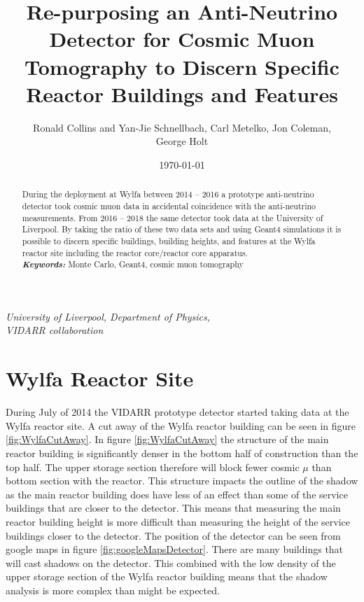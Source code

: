 \documentclass[12pt,a4paper]{article}
\title{Re-purposing an Anti-Neutrino Detector for Cosmic Muon Tomography to Discern Specific Reactor Buildings and Features}
\date{\today}
\author{Ronald Collins and Yan-Jie Schnellbach, Carl Metelko, Jon Coleman, \\George Holt}
\begin{document}
\maketitle


\begin{center}
\textit{University of Liverpool, Department of Physics,\\}
\textit{VIDARR collaboration\\}
\end{center}
 

\begin{abstract}
\normalsize During the deployment at Wylfa between 2014 -- 2016 a prototype anti-neutrino detector took cosmic muon data in accidental coincidence with the anti-neutrino measurements. From 2016 -- 2018 the same detector took data at the University of Liverpool. By taking the ratio of these two data sets and using Geant4 simulations it is possible to discern specific buildings, building heights, and features at the Wylfa reactor site including the reactor core/reactor core apparatus.\\

\providecommand{\keywords}[1]{\textbf{\textit{Keywords:}} #1} %
\keywords{Monte Carlo, Geant4, cosmic muon tomography}
\end{abstract}
\vspace{5mm} %



\section{Wylfa Reactor Site} \label{sec:wylfaReactorSite}
During July of 2014 the VIDARR prototype detector started taking data at the Wylfa reactor site. A cut away of the Wylfa reactor building can be seen in figure \ref{fig:WylfaCutAway}. In figure \ref{fig:WylfaCutAway} the structure of the main reactor building is significantly denser in the bottom half of construction than the top half. The upper storage section therefore will block fewer cosmic $\mu$ than bottom section with the reactor. This structure impacts the outline of the shadow as the main reactor building does have less of an effect than some of the service buildings that are closer to the detector. This means that measuring the main reactor building height is more difficult than measuring the height of the service buildings closer to the detector. The position of the detector can be seen from google maps in figure \ref{fig:googleMapsDetector}. There are many buildings that will cast shadows on the detector. This combined with the low density of the upper storage section of the Wylfa reactor building means that the shadow analysis is more complex than might be expected. 
\end{document}
